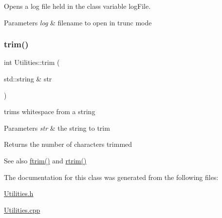 Opens a log file held in the class variable log\+File. 


\begin{DoxyParams}{Parameters}
{\em log} & filename to open in trunc mode \\
\hline
\end{DoxyParams}
\mbox{\label{class_utilities_ac71774c0324d441f542665f8f372a113}} 
\subsubsection{\texorpdfstring{trim()}{trim()}}
{\footnotesize\ttfamily int Utilities\+::trim (\begin{DoxyParamCaption}\item[{std\+::string \&}]{str }\end{DoxyParamCaption})}



trims whitespace from a string 


\begin{DoxyParams}{Parameters}
{\em str} & the string to trim \\
\hline
\end{DoxyParams}
\begin{DoxyReturn}{Returns}
the number of characters trimmed 
\end{DoxyReturn}
\begin{DoxySeeAlso}{See also}
\mbox{\hyperlink{class_utilities_a8f3e9e16a823944a3bdb67c6c3d70d08}{ftrim()}} and \mbox{\hyperlink{class_utilities_afffccc73f8e56740fdf789904bf268ee}{rtrim()}} 
\end{DoxySeeAlso}


The documentation for this class was generated from the following files\+:\begin{DoxyCompactItemize}
\item 
\mbox{\hyperlink{_utilities_8h}{Utilities.\+h}}\item 
\mbox{\hyperlink{_utilities_8cpp}{Utilities.\+cpp}}\end{DoxyCompactItemize}
